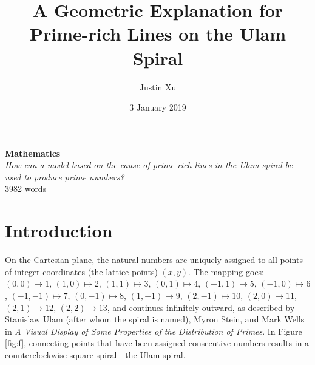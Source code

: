 \documentclass{article}
\begin{document}
\title{A Geometric Explanation for Prime-rich Lines on the Ulam Spiral}
\author{Justin Xu}
\date{3 January 2019}

\maketitle
\begin{center}
	\textbf{Mathematics} \\
	\textit{How can a model based on the cause of prime-rich lines in the Ulam spiral be used to produce prime numbers?} \\
	3982 words
\end{center}

\newpage
\tableofcontents

\newpage
{}



\section{Introduction}

On the Cartesian plane, the natural numbers are uniquely assigned to all points of integer coordinates (the lattice points) \((x,y)\). The mapping goes: \((0, 0) \mapsto 1\), \((1, 0) \mapsto 2\), \((1, 1) \mapsto 3\), \((0, 1) \mapsto 4\), \((-1, 1) \mapsto 5\), \((-1, 0) \mapsto 6\), \((-1, -1) \mapsto 7\), \((0, -1) \mapsto 8\), \((1, -1) \mapsto 9\), \((2, -1) \mapsto 10\), \((2, 0) \mapsto 11\), \((2, 1) \mapsto 12\), \((2, 2) \mapsto 13\), and continues infinitely outward, as described by Stanislaw Ulam (after whom the spiral is named), Myron Stein, and Mark Wells in \textit{A Visual Display of Some Properties of the Distribution of Primes}. In Figure \ref{fig:f}, connecting points that have been assigned consecutive numbers results in a counterclockwise square spiral---the Ulam spiral.
\end{document}
